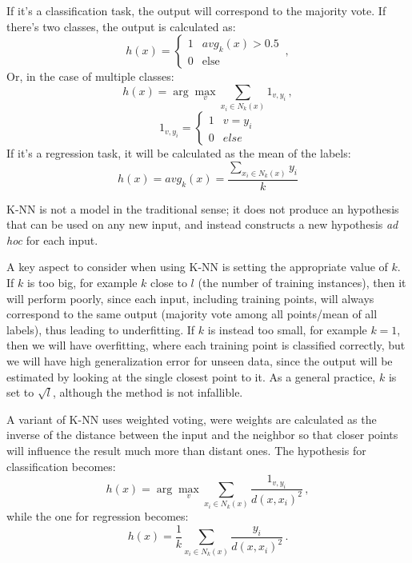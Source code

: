 If it's a classification task, the output will correspond to the majority vote. If there's two classes, the output is calculated as:
\begin{equation*}
    h(x) = \begin{cases}
        1 & \textit{avg}_k(x) > 0.5 \\
        0 & \text{else}
    \end{cases} \, ,
\end{equation*}
Or, in the case of multiple classes:
\begin{equation*}
    h(x) = \arg \max_v \sum_{x_i \in N_k(x)} 1_{v,y_i}  \, ,
\end{equation*}
\begin{equation*}
    1_{v,y_i} = \begin{cases}
        1 & v = y_i \\
        0 & else
    \end{cases}
\end{equation*}
If it's a regression task, it will be calculated as the mean of the labels:
\begin{equation*}
    h(x) = \textit{avg}_k(x) = \frac{\sum_{x_i \in N_k(x)} y_i}{k}
\end{equation*}

K-NN is not a model in the traditional sense; it does not produce an hypothesis that can be used on any new input, and instead constructs a new hypothesis \textit{ad hoc} for each input.

A key aspect to consider when using K-NN is setting the appropriate value of $k$. If $k$ is too big, for example $k$ close to $l$ (the number of training instances), then it will perform poorly, since each input, including training points, will always correspond to the same output (majority vote among all points/mean of all labels), thus leading to underfitting. If $k$ is instead too small, for example $k = 1$, then we will have overfitting, where each training point is classified correctly, but we will have high generalization error for unseen data, since the output will be estimated by looking at the single closest point to it. As a general practice, $k$ is set to $\sqrt{l}$, although the method is not infallible.

A variant of K-NN uses weighted voting, were weights are calculated as the inverse of the distance between the input and the neighbor so that closer points will influence the result much more than distant ones. The hypothesis for classification becomes:
\begin{equation*}
    h(x) = \arg \max_v \sum_{x_i \in N_k(x)}  \dfrac{1_{v,y_i}}{d(x,x_i)^2} \, ,
\end{equation*}
while the one for regression becomes:
\begin{equation*}
    h(x) = \frac{1}{k}\sum_{x_i \in N_k(x)} \dfrac{y_i}{d(x,x_i)^2} \, .
\end{equation*}

